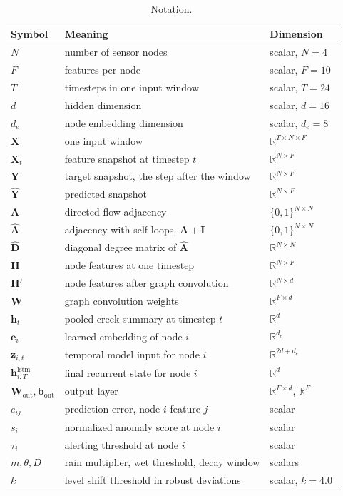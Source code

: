 \documentclass{article}
\begin{document}
\begin{table}[t]
  \centering
  \caption{Notation.}
  \label{tab:notation}
  \begin{tabular}{lll}
    \toprule
    Symbol & Meaning & Dimension \\
    \midrule
    $N$ & number of sensor nodes & scalar, $N = 4$ \\
    $F$ & features per node & scalar, $F = 10$ \\
    $T$ & timesteps in one input window & scalar, $T = 24$ \\
    $d$ & hidden dimension & scalar, $d = 16$ \\
    $d_e$ & node embedding dimension & scalar, $d_e = 8$ \\
    $\mathbf{X}$ & one input window & $\mathbb{R}^{T \times N \times F}$ \\
    $\mathbf{X}_t$ & feature snapshot at timestep $t$ & $\mathbb{R}^{N \times F}$ \\
    $\mathbf{Y}$ & target snapshot, the step after the window & $\mathbb{R}^{N \times F}$ \\
    $\hat{\mathbf{Y}}$ & predicted snapshot & $\mathbb{R}^{N \times F}$ \\
    $\mathbf{A}$ & directed flow adjacency & $\{0,1\}^{N \times N}$ \\
    $\hat{\mathbf{A}}$ & adjacency with self loops, $\mathbf{A} + \mathbf{I}$ & $\{0,1\}^{N \times N}$ \\
    $\hat{\mathbf{D}}$ & diagonal degree matrix of $\hat{\mathbf{A}}$ & $\mathbb{R}^{N \times N}$ \\
    $\mathbf{H}$ & node features at one timestep & $\mathbb{R}^{N \times F}$ \\
    $\mathbf{H}'$ & node features after graph convolution & $\mathbb{R}^{N \times d}$ \\
    $\mathbf{W}$ & graph convolution weights & $\mathbb{R}^{F \times d}$ \\
    $\mathbf{h}_t$ & pooled creek summary at timestep $t$ & $\mathbb{R}^{d}$ \\
    $\mathbf{e}_i$ & learned embedding of node $i$ & $\mathbb{R}^{d_e}$ \\
    $\mathbf{z}_{i,t}$ & temporal model input for node $i$ & $\mathbb{R}^{2d + d_e}$ \\
    $\mathbf{h}^{\text{lstm}}_{i,T}$ & final recurrent state for node $i$ & $\mathbb{R}^{d}$ \\
    $\mathbf{W}_{\text{out}}, \mathbf{b}_{\text{out}}$ & output layer & $\mathbb{R}^{F \times d}$, $\mathbb{R}^{F}$ \\
    $e_{ij}$ & prediction error, node $i$ feature $j$ & scalar \\
    $s_i$ & normalized anomaly score at node $i$ & scalar \\
    $\tau_i$ & alerting threshold at node $i$ & scalar \\
    $m, \theta, D$ & rain multiplier, wet threshold, decay window & scalars \\
    $k$ & level shift threshold in robust deviations & scalar, $k = 4.0$ \\
    \bottomrule
  \end{tabular}
\end{table}
\end{document}
